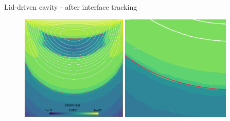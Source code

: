 \documentclass{beamer}  %
\begin{document}
\begin{frame}{Lid-driven cavity - after interface tracking}
    \begin{figure}
        \centering
        \includegraphics[width=0.45\textwidth]{../figures/cavity_last.pdf}
        \hspace{6pt}
        \includegraphics[width=0.46\textwidth]{../figures/cavity_last_crop.pdf}
    \end{figure}
\end{frame}
\end{document}
